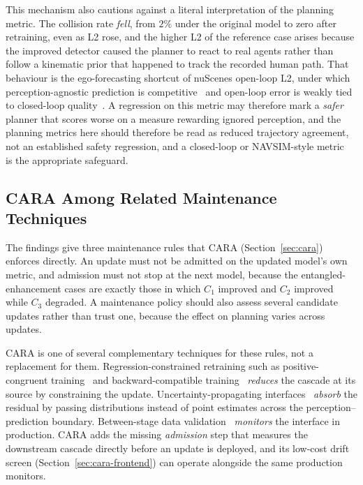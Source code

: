 \documentclass[conference]{IEEEtran}
\begin{document}
This mechanism also cautions against a literal interpretation of the planning
metric. The collision rate \emph{fell}, from $2\%$ under the original model to
zero after retraining, even as L2 rose, and the higher L2 of the reference case
arises because the improved detector caused the planner to react to real agents
rather than follow a kinematic prior that happened to track the recorded human
path. That behaviour is the ego-forecasting shortcut of nuScenes open-loop
L2, under which perception-agnostic prediction is
competitive~\cite{zhai2023rethinking} and open-loop error is weakly tied to
closed-loop quality~\cite{codevilla2018offline}. A regression on this metric may
therefore mark a \emph{safer} planner that scores worse on a measure rewarding
ignored perception, and the planning metrics here should therefore be read as reduced
trajectory agreement, not an established safety regression, and a closed-loop or
NAVSIM-style metric~\cite{dauner2024navsim} is the appropriate safeguard.

\subsection{CARA Among Related Maintenance Techniques}
The findings give three maintenance rules that CARA (Section~\ref{sec:cara})
enforces directly. An update must not be admitted on the updated model's own
metric, and admission must not stop at the next model, because the
entangled-enhancement cases are exactly those in which $C_1$ improved and $C_2$
improved while $C_3$ degraded. A maintenance policy should also assess several
candidate updates rather than trust one, because the effect on planning varies
across updates.

CARA is one of several complementary techniques for these rules, not a
replacement for them. Regression-constrained retraining such as
positive-congruent training~\cite{yan2021pctraining} and backward-compatible
training~\cite{shen2020bct} \emph{reduces} the cascade at its source by
constraining the update. Uncertainty-propagating
interfaces~\cite{ivanovic2022propagating} \emph{absorb} the residual by passing
distributions instead of point estimates across the perception--prediction
boundary. Between-stage data validation~\cite{breck2019data} \emph{monitors} the
interface in production. CARA adds the missing \emph{admission} step that measures
the downstream cascade directly before an update is deployed, and its low-cost
drift screen (Section~\ref{sec:cara-frontend}) can operate alongside
the same production monitors.
\end{document}
